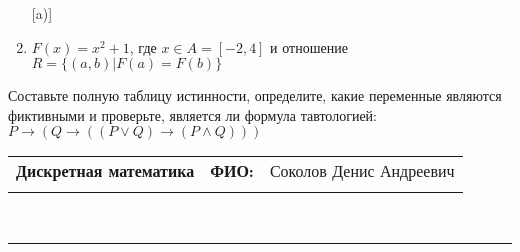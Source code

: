 \documentclass[10pt]{exam}
\newcommand{\class}{Дискретная математика}
\newcommand{\examdate}{}
\begin{document}
\begin{questions}
\begin{enumerate} [a)]
\item $F(x)=x^{2}+1$, где $x \in A = [-2, 4]$ и отношение $R = \{(a,b)|F(a) = F(b)\}$
\end{enumerate}\question Составьте полную таблицу истинности, определите, какие переменные являются фиктивными и проверьте, является ли формула тавтологией:
$ P \rightarrow (Q \rightarrow ((P \lor Q) \rightarrow (P \land Q)))$

\end{questions}
\newpage
\begin{flushright}
\begin{tabular}{p{2.8in} r l}
\textbf{\class} & \textbf{ФИО:} &Соколов Денис Андреевич
\\

\textbf{\examdate} &&\\
\end{tabular}\\
\end{flushright}
\rule[1ex]{\textwidth}{.1pt}
\end{document}
